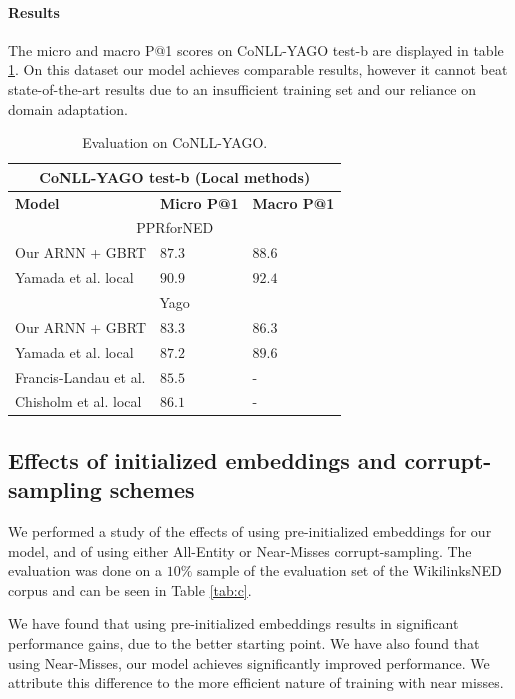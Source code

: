 \documentclass[11pt]{article}
\begin{document}
	
	\paragraph{Results}
	The micro and macro P@1 scores on CoNLL-YAGO test-b are displayed in table \ref{tab:conll}. On this dataset our model achieves comparable results, however it cannot beat state-of-the-art results due to an insufficient training set and our reliance on domain adaptation.
	
	\begin{table}[ht]
		\begin{center}
			\begin{tabular}{|p{3.5cm}| p{1.3cm} p{1.3cm}|}
				\hline \multicolumn{3}{|c|}{CoNLL-YAGO test-b (Local methods)} \\
				\hline \textbf{Model} & \textbf{Micro P@1} & \textbf{Macro P@1} \\ 
				\hline \multicolumn{3}{|c|}{PPRforNED} \\
				\hline Our ARNN + GBRT    & $87.3$  & $88.6$ \\
				Yamada et al. local               & $90.9$  & $92.4$ \\
				\hline \multicolumn{3}{|c|}{Yago} \\
				\hline Our ARNN + GBRT    & $83.3$  & $86.3$ \\
				Yamada et al. local               & $87.2$  & $89.6$ \\
				Francis-Landau et al.             & $85.5$  & - \\
				Chisholm et al. local             & $86.1$  & - \\
				\hline
			\end{tabular}
		\end{center}
		\caption{\label{tab:conll} Evaluation on CoNLL-YAGO.}
	\end{table}
	
	\subsection{Effects of initialized embeddings and corrupt-sampling schemes}
	\label{experiments:effect}
	
	We performed a study of the effects of using pre-initialized embeddings for our model, and of using either All-Entity or Near-Misses corrupt-sampling. The evaluation was done on a $10\%$ sample of the evaluation set of the WikilinksNED corpus and can be seen in Table \ref{tab:c}. 
	
	We have found that using pre-initialized embeddings results in significant performance gains, due to the better starting point. We have also found that using Near-Misses, our model achieves significantly improved performance. We attribute this difference to the more efficient nature of training with near misses.
	
\end{document}
